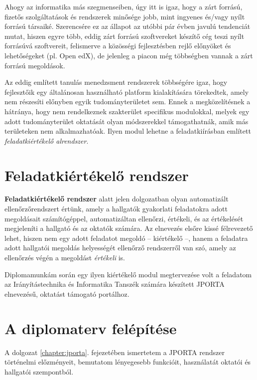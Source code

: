 Ahogy az informatika más szegmenseiben, úgy itt is igaz, hogy a zárt forrású, fizetős szolgáltatások és rendszerek minősége jobb, mint ingyenes és/vagy nyílt forrású társaiké.
Szerencsére ez az állapot az utóbbi pár évben javulú tendenciát mutat, hiszen egyre több, eddig zárt forrású szoftvereket készítő cég teszi nyílt forrásúvá szoftvereit, felismerve a közösségi fejlesztésben rejlő előnyöket és lehetőségeket (pl. Open edX), de jelenleg a piacon még többségben vannak a zárt forrású megoldások.

Az eddig említett tanulás menedzsment rendszerek többségére igaz, hogy fejlesztőik egy általánosan használható platform kialakítására törekedtek, amely nem részesíti előnyben egyik tudományterületet sem.
Ennek a megközelítésnek a hátránya, hogy nem rendelkeznek szakterület specifikus modulokkal, melyek egy adott tudományterület oktatását olyan módszerekkel támogathatnák, amik más területeken nem alkalmazhatóak.
Ilyen modul lehetne a feladatkiírásban említett \textit{feladatkiértékelő alrendszer}.

\section*{Feladatkiértékelő rendszer}
\textbf{Feladatkiértékelő rendszer} alatt jelen dolgozatban olyan automatizált ellenőrzőrendszert értünk, amely a hallgatók gyakorlati feladatokra adott megoldásait számítógéppel, automatizáltan ellenőrzi, értékeli, és az értékelését megjeleníti a hallgató és az oktatók számára.
Az elnevezés elsőre kissé félrevezető lehet, hiszen nem egy adott feladatot megoldó -- kiértékelő --, hanem a feladatra adott hallgatói megoldás helyességét ellenőrző rendszerről van szó, amely az ellenőrzés végén a megoldást \textit{értékeli} is.

Diplomamunkám során egy ilyen kiértékelő modul megtervezése volt a feladatom az Irányítástechnika és Informatika Tanszék számára készített JPORTA elnevezésű, oktatást támogató portálhoz.

\section*{A diplomaterv felépítése}
A dolgozat \ref{chapter:jporta}. fejezetében ismertetem a JPORTA rendszer történelmi előzményeit, bemutatom lényegesebb funkcióit, használatát oktatói és hallgatói szempontból.

